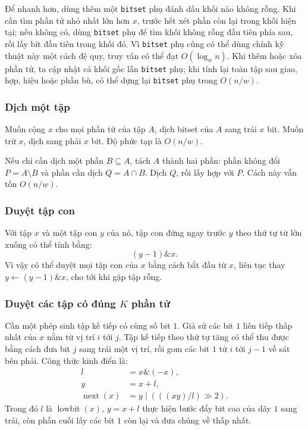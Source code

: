 \documentclass[11pt]{article}
\begin{document}
Để nhanh hơn, dùng thêm một \texttt{bitset} phụ đánh dấu khối nào không rỗng.
Khi cần tìm phần tử nhỏ nhất lớn hơn \(x\), trước hết xét phần còn lại trong
khối hiện tại; nếu không có, dùng \texttt{bitset} phụ để tìm khối không rỗng
đầu tiên phía sau, rồi lấy bit đầu tiên trong khối đó. Vì \texttt{bitset} phụ
cũng có thể dùng chính kỹ thuật này một cách đệ quy, truy vấn có thể đạt
\(O(\log_w n)\). Khi thêm hoặc xóa phần tử, ta cập nhật cả khối gốc lẫn
\texttt{bitset} phụ; khi tính lại toàn tập sau giao, hợp, hiệu hoặc phần bù,
có thể dựng lại \texttt{bitset} phụ trong \(O(n/w)\).

\subsubsection{Dịch một tập}

Muốn cộng \(x\) cho mọi phần tử của tập \(A\), dịch bitset của \(A\) sang trái
\(x\) bit. Muốn trừ \(x\), dịch sang phải \(x\) bit. Độ phức tạp là
\(O(n/w)\).

Nếu chỉ cần dịch một phần \(B\subseteq A\), tách \(A\) thành hai phần: phần
không đổi \(P=A\setminus B\) và phần cần dịch \(Q=A\cap B\). Dịch \(Q\), rồi
lấy hợp với \(P\). Cách này vẫn tốn \(O(n/w)\).

\subsubsection{Duyệt tập con}

Với tập \(x\) và một tập con \(y\) của nó, tập con đứng ngay trước \(y\) theo
thứ tự từ lớn xuống có thể tính bằng:
\[
  (y-1)\&x.
\]
Vì vậy có thể duyệt mọi tập con của \(x\) bằng cách bắt đầu từ \(x\), liên tục
thay \(y\leftarrow (y-1)\&x\), cho tới khi gặp tập rỗng.

\subsubsection{\texorpdfstring{Duyệt các tập có đúng \(K\) phần tử}{Duyệt các tập có đúng K phần tử}}

Cần một phép sinh tập kế tiếp có cùng số bit \(1\). Giả sử các bit \(1\) liên
tiếp thấp nhất của \(x\) nằm từ vị trí \(i\) tới \(j\). Tập kế tiếp theo thứ tự
tăng có thể thu được bằng cách đưa bit \(j\) sang trái một vị trí, rồi gom các
bit \(1\) từ \(i\) tới \(j-1\) về sát bên phải. Công thức kinh điển là:
\[
\begin{aligned}
  l &= x\&(-x),\\
  y &= x+l,\\
  \operatorname{next}(x) &= y\;|\;(((x\mathbin{\hat{}}y)/l)\gg 2).
\end{aligned}
\]
Trong đó \(l\) là \(\operatorname{lowbit}(x)\), \(y=x+l\) thực hiện bước đẩy
bit cao của dãy \(1\) sang trái, còn phần cuối lấy các bit \(1\) còn lại và
đưa chúng về thấp nhất.
\end{document}
